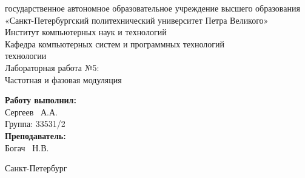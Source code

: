 \documentclass[a4paper]{article}
\begin{document}

\begin{titlepage}	%

	\begin{center}		%

		 государственное автономное образовательное учреждение высшего образования «Санкт-Петербургский политехнический университет Петра Великого» \\
		\large Институт компьютерных наук и технологий \\
		\large Кафедра компьютерных систем и программных технологий\\[2cm]
		
	    \vfill
		 технологии\\[0.5cm] %
		\large Лабораторная работа №5:\\
		Частотная и фазовая модуляция\\[4.8cm]

	\end{center}

	\begin{flushright} %
		\begin{minipage}{0.25\textwidth} %
			\begin{flushleft} %

				\large\textbf{Работу выполнил:}\\
				\large Сергеев ~А.А.\\
				\large {Группа:} 33531/2\\
				
				\large \textbf{Преподаватель:}\\
				\large Богач ~Н.В.\\

			\end{flushleft}
		\end{minipage}
	\end{flushright}
	
	\vfill %

	\begin{center}
	\large Санкт-Петербург\\
	\large \the\year %
	\end{center} %

\thispagestyle{empty} %
\end{titlepage} %
\vfill %
\end{document}
